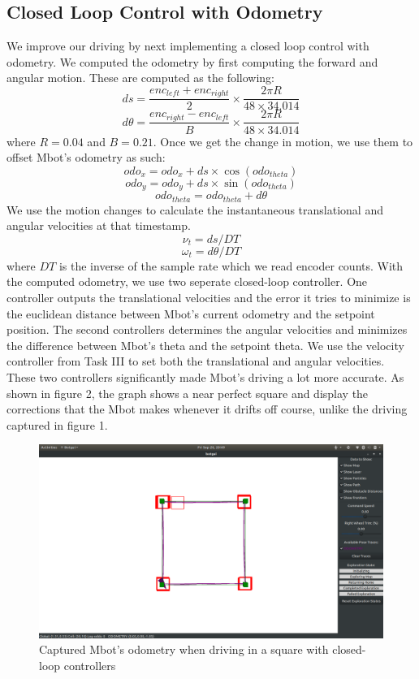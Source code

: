 \documentclass[conference]{IEEEtran}
\begin{document}
\subsection{Closed Loop Control with Odometry}
We improve our driving by next implementing a closed loop control with odometry. We computed the odometry by first computing the forward and angular motion. These are computed as the following:
\[ds = \frac{enc_{left} + enc_{right}}{2} \times \frac{2 \pi R}{48 \times 34.014}\]
\[d\theta = \frac{enc_{right} - enc_{left}}{B} \times \frac{2 \pi R}{48 \times 34.014}\]
where $R = 0.04$ and $B = 0.21$. Once we get the change in motion, we use them to offset Mbot's odometry as such:
\[odo_{x} = odo_{x} + ds \times \cos(odo_{theta})\]
\[odo_{y} = odo_{y} + ds \times \sin(odo_{theta})\]
\[odo_{theta} = odo_{theta} + d\theta\]
We use the motion changes to calculate the instantaneous translational and angular velocities at that timestamp.
\[\nu_{t} = ds / DT \]
\[\omega_{t} = d\theta / DT \]
where $DT$ is the inverse of the sample rate which we read encoder counts. With the computed odometry, we use two seperate closed-loop controller. One controller outputs the translational velocities and the error it tries to minimize is the euclidean distance between Mbot's current odometry and the setpoint position. The second controllers determines the angular velocities and minimizes the difference between Mbot's theta and the setpoint theta. We use the velocity controller from Task III to set both the translational and angular velocities.\\
These two controllers significantly made Mbot's driving a lot more accurate. As shown in figure 2, the graph shows a near perfect square and display the corrections that the Mbot makes whenever it drifts off course, unlike the driving captured in figure 1.
\begin{figure}[htp]
    \centering
    \includegraphics[width=\linewidth]{odometry_square.png}
    \caption{Captured Mbot's odometry when driving in a square with closed-loop controllers}
    \label{fig:Captured Mbot's odometry when driving in a square with closed-loop controllers}
\end{figure}
\end{document}
